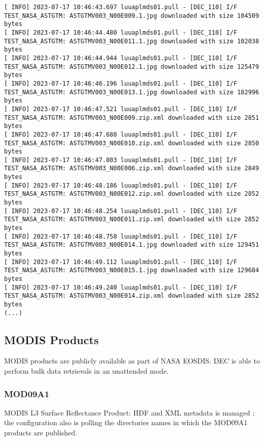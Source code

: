 \documentclass[dec_sum_main.tex]{subfiles}
\begin{document}
\begin{Verbatim}[fontsize=\tiny]
[ INFO] 2023-07-17 10:46:43.697 luuaplmds01.pull - [DEC_110] I/F TEST_NASA_ASTGTM: ASTGTMV003_N00E009.1.jpg downloaded with size 104509 bytes
[ INFO] 2023-07-17 10:46:44.480 luuaplmds01.pull - [DEC_110] I/F TEST_NASA_ASTGTM: ASTGTMV003_N00E011.1.jpg downloaded with size 102038 bytes
[ INFO] 2023-07-17 10:46:44.944 luuaplmds01.pull - [DEC_110] I/F TEST_NASA_ASTGTM: ASTGTMV003_N00E012.1.jpg downloaded with size 125479 bytes
[ INFO] 2023-07-17 10:46:46.196 luuaplmds01.pull - [DEC_110] I/F TEST_NASA_ASTGTM: ASTGTMV003_N00E013.1.jpg downloaded with size 182996 bytes
[ INFO] 2023-07-17 10:46:47.521 luuaplmds01.pull - [DEC_110] I/F TEST_NASA_ASTGTM: ASTGTMV003_N00E009.zip.xml downloaded with size 2851 bytes
[ INFO] 2023-07-17 10:46:47.688 luuaplmds01.pull - [DEC_110] I/F TEST_NASA_ASTGTM: ASTGTMV003_N00E010.zip.xml downloaded with size 2850 bytes
[ INFO] 2023-07-17 10:46:47.803 luuaplmds01.pull - [DEC_110] I/F TEST_NASA_ASTGTM: ASTGTMV003_N00E006.zip.xml downloaded with size 2849 bytes
[ INFO] 2023-07-17 10:46:48.186 luuaplmds01.pull - [DEC_110] I/F TEST_NASA_ASTGTM: ASTGTMV003_N00E012.zip.xml downloaded with size 2852 bytes
[ INFO] 2023-07-17 10:46:48.254 luuaplmds01.pull - [DEC_110] I/F TEST_NASA_ASTGTM: ASTGTMV003_N00E011.zip.xml downloaded with size 2852 bytes
[ INFO] 2023-07-17 10:46:48.758 luuaplmds01.pull - [DEC_110] I/F TEST_NASA_ASTGTM: ASTGTMV003_N00E014.1.jpg downloaded with size 129451 bytes
[ INFO] 2023-07-17 10:46:49.112 luuaplmds01.pull - [DEC_110] I/F TEST_NASA_ASTGTM: ASTGTMV003_N00E015.1.jpg downloaded with size 129684 bytes
[ INFO] 2023-07-17 10:46:49.240 luuaplmds01.pull - [DEC_110] I/F TEST_NASA_ASTGTM: ASTGTMV003_N00E014.zip.xml downloaded with size 2852 bytes
(...)
\end{Verbatim}

\subsection{MODIS Products}
MODIS products are publicly available as part of NASA EOSDIS. DEC is able to perform bulk data retrievals in an unattended mode.\newline


\subsubsection{MOD09A1}
MODIS L3 Surface Reflectance Product: HDF and XML metadata is managed ; the configuration also is polling the directories names in which the MOD09A1 products are published.\newline
\end{document}

